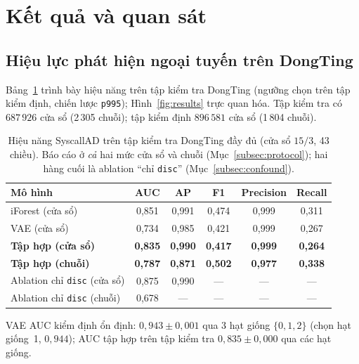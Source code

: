 \section{Kết quả và quan sát}
\label{sec:results}

\noindent{}

\subsection{Hiệu lực phát hiện ngoại tuyến trên DongTing}
Bảng~\ref{tab:offline} trình bày hiệu năng trên tập kiểm tra DongTing (ngưỡng chọn
trên tập kiểm định, chiến lược \texttt{p995}); Hình~\ref{fig:results} trực quan hóa. Tập kiểm tra có $687\,926$ cửa sổ
(2\,305 chuỗi); tập kiểm định $896\,581$ cửa sổ (1\,804 chuỗi).

\begin{table}[htbp]
  \centering
  \caption{Hiệu năng SyscallAD trên tập kiểm tra DongTing đầy đủ (cửa sổ $15/3$,
           43 chiều). Báo cáo ở \emph{cả} hai mức cửa sổ và chuỗi
           (Mục~\ref{subsec:protocol}); hai hàng cuối là ablation
           ``chỉ \texttt{disc}'' (Mục~\ref{subsec:confound}).}
  \label{tab:offline}
  \begin{tabular}{lccccc}
    \toprule
    \textbf{Mô hình} & \textbf{AUC} & \textbf{AP} & \textbf{F1} & \textbf{Precision} & \textbf{Recall} \\
    \midrule
    iForest (cửa sổ)            & 0{,}851 & 0{,}991 & 0{,}474 & 0{,}999 & 0{,}311 \\
    VAE (cửa sổ)                & 0{,}734 & 0{,}985 & 0{,}421 & 0{,}999 & 0{,}267 \\
    \textbf{Tập hợp (cửa sổ)}   & \textbf{0{,}835} & \textbf{0{,}990} & \textbf{0{,}417} & \textbf{0{,}999} & \textbf{0{,}264} \\
    \textbf{Tập hợp (chuỗi)}    & \textbf{0{,}787} & \textbf{0{,}871} & \textbf{0{,}502} & \textbf{0{,}977} & \textbf{0{,}338} \\
    \midrule
    Ablation chỉ \texttt{disc} (cửa sổ) & 0{,}875 & 0{,}990 & --- & --- & --- \\
    Ablation chỉ \texttt{disc} (chuỗi)  & 0{,}678 & --- & --- & --- & --- \\
    \bottomrule
  \end{tabular}

  \vspace{2pt}
  {\footnotesize VAE AUC kiểm định ổn định: $0{,}943 \pm 0{,}001$ qua 3 hạt giống
  $\{0,1,2\}$ (chọn hạt giống~1, $0{,}944$); AUC tập hợp trên tập kiểm tra
  $0{,}835 \pm 0{,}000$ qua các hạt giống.}
\end{table}

